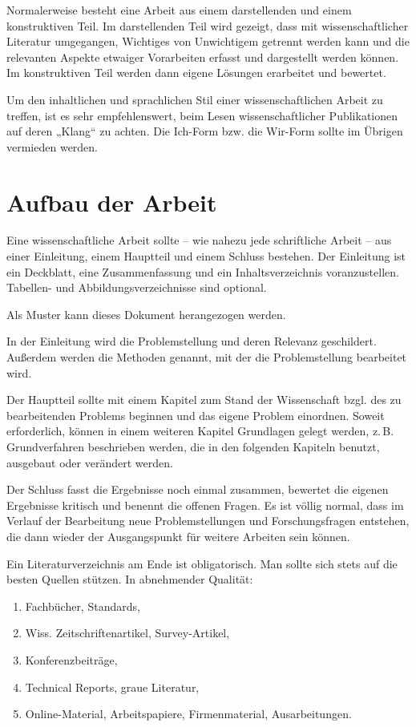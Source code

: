\documentclass[
    fontsize=12pt,
    headings=small,
    parskip=half,           %
    bibliography=totoc,
    numbers=noenddot,       %
    open=any,               %
    ]{scrreprt}
\begin{document}
Normalerweise besteht eine Arbeit aus einem darstellenden und einem konstruktiven Teil. Im darstellenden Teil wird gezeigt, dass mit wissenschaftlicher Literatur umgegangen, Wichtiges von Unwichtigem getrennt werden kann und die relevanten Aspekte etwaiger Vorarbeiten erfasst und dargestellt werden können. Im konstruktiven Teil werden dann eigene Lösungen erarbeitet und bewertet.

Um den inhaltlichen und sprachlichen Stil einer wissenschaftlichen Arbeit zu treffen, ist es sehr empfehlenswert, beim Lesen wissenschaftlicher Publikationen auf deren „Klang“ \cite{Tolk2003} zu achten. Die Ich-Form bzw. die Wir-Form sollte im Übrigen vermieden werden.

\section{Aufbau der Arbeit}
\label{sec.aufbau}

Eine wissenschaftliche Arbeit sollte -- wie nahezu jede schriftliche Arbeit -- aus einer Einleitung, einem Hauptteil und einem Schluss bestehen. Der Einleitung ist ein Deckblatt, eine Zusammenfassung und ein Inhaltsverzeichnis voranzustellen. Tabellen- und Abbildungsverzeichnisse sind optional.

Als Muster kann dieses Dokument herangezogen werden.

In der Einleitung wird die Problemstellung und deren Relevanz geschildert. Außerdem werden die Methoden genannt, mit der die Problemstellung bearbeitet wird.

Der Hauptteil sollte mit einem Kapitel zum Stand der Wissenschaft bzgl. des zu bearbeitenden Problems beginnen und das eigene Problem einordnen. Soweit erforderlich, können in einem weiteren Kapitel Grundlagen gelegt werden, z.\,B. Grundverfahren beschrieben werden, die in den folgenden Kapiteln benutzt, ausgebaut oder verändert werden.

Der Schluss fasst die Ergebnisse noch einmal zusammen, bewertet die eigenen Ergebnisse kritisch und benennt die offenen Fragen. Es ist völlig normal, dass im Verlauf der Bearbeitung neue Problemstellungen und Forschungsfragen entstehen, die dann wieder der Ausgangspunkt für weitere Arbeiten sein können.

Ein Literaturverzeichnis am Ende ist obligatorisch. Man sollte sich stets auf die besten Quellen stützen. In abnehmender Qualität:

\begin{enumerate}
	\item Fachbücher, Standards,
	\item Wiss. Zeitschriftenartikel, Survey-Artikel,
	\item Konferenzbeiträge,
	\item Technical Reports, graue Literatur,
	\item Online-Material, Arbeitspapiere, Firmenmaterial, Ausarbeitungen.
\end{enumerate}
\end{document}
